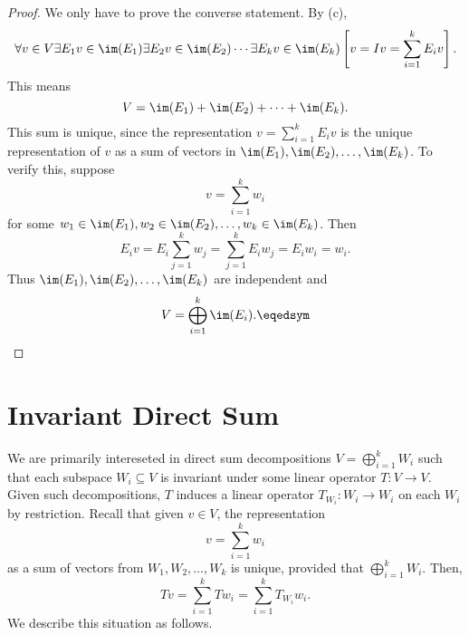 \documentclass[linearalgebraII]{subfiles}
\begin{document}
    \begin{proof}
        We only have to prove the converse statement. By (c),
        \begin{equation*}
            \forall v\in V\exists E_1v\in \im(E_1)\exists E_2v\in \im(E_2)\cdots\exists E_kv\in \im(E_k) \left[ v = Iv = \sum^{k}_{i=1} E_iv \right].
        \end{equation*}
        This means
        \begin{equation*}
            V = \im(E_1) + \im(E_2) + \cdots + \im(E_k).
        \end{equation*}
        This sum is unique, since the representation $v = \sum^{k}_{i=1} E_iv$ is the unique representation of $v$ as a sum of vectors in $\im(E_1), \im(E_2), \ldots, \im(E_k)$. To verify this, suppose
        \begin{equation*}
            v = \sum^{k}_{i=1} w_i
        \end{equation*}
        for some $w_1\in \im(E_1), w_2\in \im(E_2), \ldots, w_k\in \im(E_k)$. Then
        \begin{equation*}
            E_iv = E_i \sum^{k}_{j=1} w_j = \sum^{k}_{j=1} E_iw_j = E_iw_i = w_i.
        \end{equation*}
        Thus $\im(E_1), \im(E_2), \ldots, \im(E_k)$ are independent and
        \begin{equation*}
            V = \bigoplus^{k}_{i=1} \im(E_i). \eqedsym
        \end{equation*}
    \end{proof}

    \section{Invariant Direct Sum}

    \begin{remark}
        We are primarily intereseted in direct sum decompositions $V = \bigoplus^{k}_{i=1} W_i$ such that each subspace $W_i\subseteq V$ is invariant under some linear operator $T:V\to V$. Given such decompositions, $T$ induces a linear operator $T_{W_i}: W_i\to W_i$ on each $W_i$ by restriction. Recall that given $v\in V$, the representation
        \begin{equation*}
            v = \sum^{k}_{i=1} w_i
        \end{equation*}
        as a sum of vectors from $W_1, W_2, \ldots, W_k$ is unique, provided that $\bigoplus^{k}_{i=1} W_i$. Then,
        \begin{equation*}
            Tv = \sum^{k}_{i=1} Tw_i = \sum^{k}_{i=1} T_{W_i}w_i.
        \end{equation*}
        We describe this situation as follows.
    \end{remark}
\end{document}
